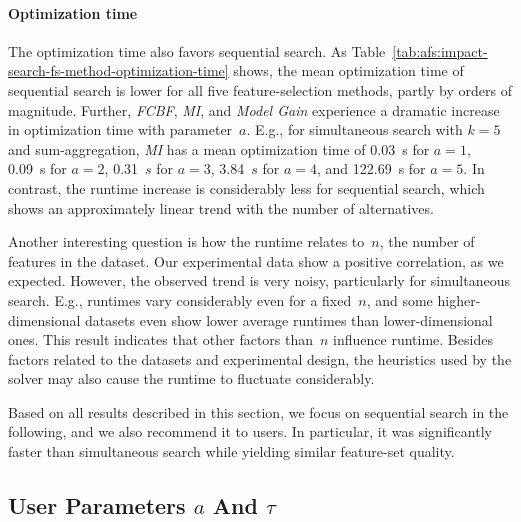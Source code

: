 \documentclass[iicol, sn-basic, Numbered]{sn-jnl} %
\theoremstyle{plain}
\theoremstyle{definition}
\begin{document}
\paragraph{Optimization time}

The optimization time also favors sequential search.
As Table~\ref{tab:afs:impact-search-fs-method-optimization-time} shows, the mean optimization time of sequential search is lower for all five feature-selection methods, partly by orders of magnitude.
Further, \emph{FCBF}, \emph{MI}, and \emph{Model Gain} experience a dramatic increase in optimization time with parameter~$a$.
E.g., for simultaneous search with $k=5$ and sum-aggregation, \emph{MI} has a mean optimization time of 0.03~s for $a=1$, 0.09~s for $a=2$, 0.31~$s$ for $a=3$, 3.84~$s$ for $a=4$, and 122.69~s for $a=5$.
In contrast, the runtime increase is considerably less for sequential search, which shows an approximately linear trend with the number of alternatives.

Another interesting question is how the runtime relates to~$n$, the number of features in the dataset.
Our experimental data show a positive correlation, as we expected.
However, the observed trend is very noisy, particularly for simultaneous search.
E.g., runtimes vary considerably even for a fixed~$n$, and some higher-dimensional datasets even show lower average runtimes than lower-dimensional ones.
This result indicates that other factors than~$n$ influence runtime.
Besides factors related to the datasets and experimental design, the heuristics used by the solver may also cause the runtime to fluctuate considerably.

Based on all results described in this section, we focus on sequential search in the following, and we also recommend it to users.
In particular, it was significantly faster than simultaneous search while yielding similar feature-set quality.

\subsection{User Parameters \texorpdfstring{$a$ And $\tau$}{}} %
\label{sec:afs:evaluation:parameters}
\end{document}
